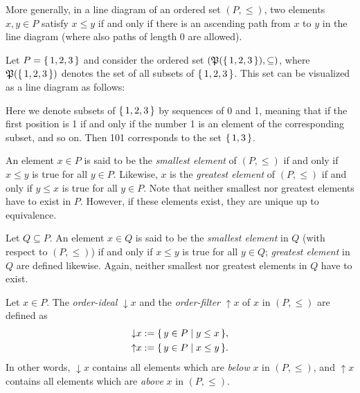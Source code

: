 More generally, in a line diagram of an ordered set $(P, \le)$, two elements $x, y \in P$
satisfy $x \le y$ if and only if there is an ascending path from $x$ to $y$ in the line
diagram (where also paths of length 0 are allowed).

\begin{Example}
  \label{expl:2}
  Let $P = {\{\, 1, 2, 3 \,\}}$ and consider the ordered set $({\mathfrak{P}({\{\,1,2,3\,\}})},
  \subseteq)$, where ${\mathfrak{P}({\{\,1,2,3\,\}})}$ denotes the set of all subsets of
  ${\{\,1,2,3\,\}}$.  This set can be visualized as a line diagram as follows:
  \begin{center}
  \end{center}
  Here we denote subsets of ${\{\,1,2,3\,\}}$ by sequences of 0 and 1, meaning that if the
  first position is 1 if and only if the number 1 is an element of the corresponding
  subset, and so on.  Then 101 corresponds to the set ${\{\,1,3\,\}}$.
\end{Example}

An element $x \in P$ is said to be the \emph{smallest element} of $(P, \le)$ if and only
if $x \le y$ is true for all $y \in P$.  Likewise, $x$ is the \emph{greatest element} of
$(P, \le)$ if and only if $y \le x$ is true for all $y \in P$.  Note that neither smallest
nor greatest elements have to exist in $P$.  However, if these elements exist, they are
unique up to equivalence.

Let $Q \subseteq P$.  An element $x \in Q$ is said to be the \emph{smallest element} in
$Q$ (with respect to $(P, \le)$) if and only if $x \le y$ is true for all $y \in Q$;
\emph{greatest element} in $Q$ are defined likewise.  Again, neither smallest nor greatest
elements in $Q$ have to exist.

Let $x \in P$.  The \emph{order-ideal} ${\downarrow}x$ and the \emph{order-filter}
${\uparrow} x$ of $x$ in $(P, \le)$ are defined as
\begin{align*}
  {\downarrow} x &:= {\{\, y \in P \mid y \le x \,\}},\\
  {\uparrow} x &:= {\{\, y \in P \mid x \le y \,\}}.
\end{align*}
In other words, ${\downarrow} x$ contains all elements which are \emph{below} $x$ in $(P,
\le)$, and ${\uparrow} x$ contains all elements which are \emph{above} $x$ in $(P, \le)$.

